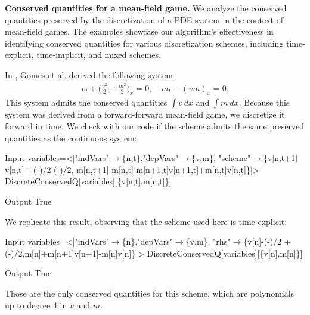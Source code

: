 \documentclass[runningheads]{llncs}
\newcommand{\1}{\chi}
\begin{document}
{\bf Conserved quantities for a mean-field game.}
We analyze the conserved quantities preserved by the discretization of a PDE system in the context of mean-field games.
The examples showcase our algorithm's effectiveness in identifying conserved quantities for various discretization schemes, including time-explicit, time-implicit, and mixed schemes.
\begin{example}
	In \cite{gomes18}, Gomes et al. derived the following system
	\begin{gather*}
		v_t+\Big(\frac{v^2}{2}-\frac{m^2}{2}\Big)_x=0,\quad
		m_t-(vm)_x=0.
	\end{gather*}
	This system admits the conserved quantities $\int v\ dx$ and $\int m\ dx$.
	Because this system was derived from a forward-forward mean-field game, we discretize it forward in time. We check with our code if the scheme admits the same preserved quantities as the continuous system:
	
	\begin{small}
		\begin{mmaCell}[moredefined={variables, DiscreteConservedQ}]{Input}
  variables=<|"indVars"\(\pmb{\to}\)\{n,t\},"depVars"\(\pmb{\to}\)\{v,m\},
  "scheme"\(\pmb{\to}\)\{v[n,t+1]-v[n,t]
  +(-)/2-(-)/2,
  m[n,t+1]-m[n,t]-m[n+1,t]v[n+1,t]+m[n,t]v[n,t]\}|>
  DiscreteConservedQ[variables][\{v[n,t],m[n,t]\}]
  
\end{mmaCell}
		\begin{mmaCell}{Output}
  True
\end{mmaCell}
	\end{small}
We replicate this result, observing that the scheme used here is time-explicit:
	
	\begin{small}
		\begin{mmaCell}[moredefined={variables, DiscreteConservedQ}]{Input}
  variables=<|"indVars"\(\pmb{\to}\)\{n\},"depVars"\(\pmb{\to}\)\{v,m\},
  "rhs"\(\pmb{\to}\)\{v[n]-(-)/2
  +(-)/2,m[n]+m[n+1]v[n+1]-m[n]v[n]\}|>
  DiscreteConservedQ[variables][\{v[n],m[n]\}]
  
\end{mmaCell}
		\begin{mmaCell}{Output}
  True
\end{mmaCell}
	\end{small}
	Those are the only conserved quantities for this scheme, which are polynomials up to degree 4 in $v$ and $m$.
	

\end{example}
\end{document}
